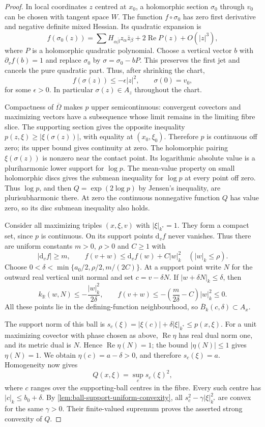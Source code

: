 \begin{proof}
In local coordinates $z$ centred at $x_0$, a holomorphic section $\sigma_0$ through $v_0$ can be chosen with tangent space $W$. The function $f\circ\sigma_0$ has zero first derivative and negative definite mixed Hessian. Its quadratic expansion is
\[
 f(\sigma_0(z))=\sum H_{\alpha\bar\beta}z_\alpha\bar z_\beta
                    +2\operatorname{Re}P(z)+O(|z|^3),
\]
where $P$ is a holomorphic quadratic polynomial. Choose a vertical vector $b$ with $\partial_vf(b)=1$ and replace $\sigma_0$ by $\sigma=\sigma_0-bP$. This preserves the first jet and cancels the pure quadratic part. Thus, after shrinking the chart,
\[
 f(\sigma(z))\leq-\epsilon|z|^2,
 \qquad \sigma(0)=v_0,
\]
for some $\epsilon>0$. In particular $\sigma(z)\in A_z$ throughout the chart.

Compactness of $\overline\Omega$ makes $p$ upper semicontinuous: convergent covectors and maximizing vectors have a subsequence whose limit remains in the limiting fibre slice. The supporting section gives the opposite inequality $p(z,\xi)\geq|\xi(\sigma(z))|$, with equality at $(x_0,\xi_0)$. Therefore $p$ is continuous off zero; its upper bound gives continuity at zero. The holomorphic pairing $\xi(\sigma(z))$ is nonzero near the contact point. Its logarithmic absolute value is a pluriharmonic lower support for $\log p$. The mean-value property on small holomorphic discs gives the submean inequality for $\log p$ at every point off zero. Thus $\log p$, and then $Q=\exp(2\log p)$ by Jensen's inequality, are plurisubharmonic there. At zero the continuous nonnegative function $Q$ has value zero, so its disc submean inequality also holds.

Consider all maximizing triples $(x,\xi,v)$ with $|\xi|_{k^*}=1$. They form a compact set, since $p$ is continuous. On its support points $\mathrm d_vf$ never vanishes. Thus there are uniform constants $m>0$, $\rho>0$ and $C\geq1$ with
\[
 |\mathrm d_vf|\geq m,\qquad
 f(v+w)\leq\mathrm d_vf(w)+C|w|_k^2\quad (|w|_k\leq\rho).
\]
Choose $0<\delta<\min\{a_0/2,\rho/2,m/(2C)\}$. At a support point write $N$ for the outward real vertical unit normal and set $c=v-\delta N$. If $|w+\delta N|_k\leq\delta$, then
\[
 k_{\mathbb R}(w,N)\leq-\frac{|w|_k^2}{2\delta},\qquad
 f(v+w)\leq-\left(\frac{m}{2\delta}-C\right)|w|_k^2\leq0.
\]
All these points lie in the defining-function neighbourhood, so $\overline B_k(c,\delta)\subset A_x$.

The support norm of this ball is $s_c(\xi)=|\xi(c)|+\delta|\xi|_{k^*}\leq p(x,\xi)$. For a unit maximizing covector with phase chosen as above, $\operatorname{Re}\eta$ has real dual norm one, and its metric dual is $N$. Hence $\operatorname{Re}\eta(N)=1$; the bound $|\eta(N)|\leq1$ gives $\eta(N)=1$. We obtain $\eta(c)=a-\delta>0$, and therefore $s_c(\xi)=a$. Homogeneity now gives
\[
 Q(x,\xi)=\sup_c s_c(\xi)^2,
\]
where $c$ ranges over the supporting-ball centres in the fibre. Every such centre has $|c|_k\leq b_0+\delta$. By \cref{lem:ball-support-uniform-convexity}, all $s_c^2-\gamma|\xi|_{k^*}^2$ are convex for the same $\gamma>0$. Their finite-valued supremum proves the asserted strong convexity of $Q$.


\end{proof}
